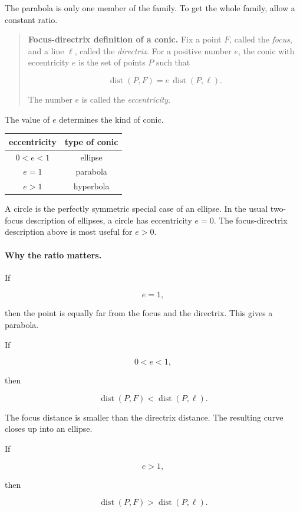 The parabola is only one member of the family.  To get the whole family, allow a constant
ratio.

\begin{quote}
\textbf{Focus-directrix definition of a conic.}
Fix a point \(F\), called the \emph{focus}, and a line \(\ell\), called the \emph{directrix}.
For a positive number \(e\), the conic with eccentricity \(e\) is the set of points \(P\)
such that

\[
\boxed{
\operatorname{dist}(P,F)=e\,\operatorname{dist}(P,\ell).
}
\]

The number \(e\) is called the \emph{eccentricity}.
\end{quote}

The value of \(e\) determines the kind of conic.

\begin{center}
\begin{tabular}{c|c}
\textbf{eccentricity} & \textbf{type of conic} \\ \hline
\(0<e<1\) & ellipse \\
\(e=1\) & parabola \\
\(e>1\) & hyperbola
\end{tabular}
\end{center}

A circle is the perfectly symmetric special case of an ellipse.  In the usual two-focus
description of ellipses, a circle has eccentricity \(e=0\).  The focus-directrix description
above is most useful for \(e>0\).

\paragraph{Why the ratio matters.}
If

\[
e=1,
\]

then the point is equally far from the focus and the directrix.  This gives a parabola.

If

\[
0<e<1,
\]

then

\[
\operatorname{dist}(P,F)<\operatorname{dist}(P,\ell).
\]

The focus distance is smaller than the directrix distance.  The resulting curve closes up
into an ellipse.

If

\[
e>1,
\]

then

\[
\operatorname{dist}(P,F)>\operatorname{dist}(P,\ell).
\]


